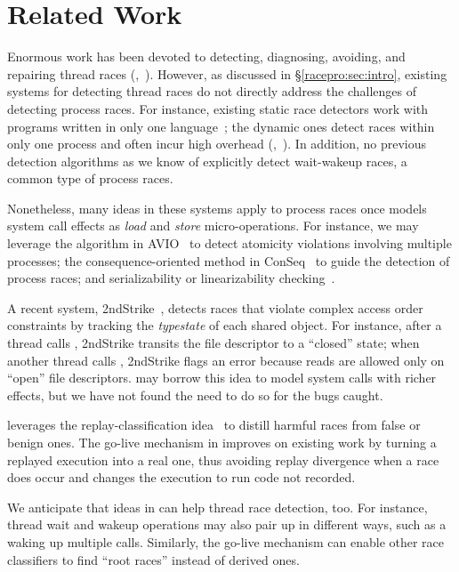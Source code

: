 \section{Related Work} \label{racepro:sec:related}

  Enormous work has been devoted to detecting,
diagnosing, avoiding, and repairing thread races
(\eg,~\cite{racerx:sosp03,chord:pldi06,pinsel:pldi07,racefuzzer:pldi08,wu:loom:osdi10,yu:racetrack:sosp}).
However, as discussed in \S\ref{racepro:sec:intro}, existing systems for detecting
thread races do not directly address the challenges of detecting process
races.  For instance, existing static race detectors work with programs
written in only one language~\cite{racerx:sosp03,chord:pldi06}; the
dynamic ones detect races within only one process and often incur high
overhead (\eg,~\cite{musuvathi:chess:osdi08}).  In addition, no previous
detection algorithms as we know of explicitly detect wait-wakeup races, a
common type of process races.

Nonetheless, many ideas in these systems apply to process races once \racepro
models system call effects as \emph{load} and \emph{store} micro-operations. 
For instance, we may leverage the algorithm in AVIO~\cite{avio:asplos06} to
detect atomicity violations involving multiple processes; the
consequence-oriented method in ConSeq~\cite{conseq:asplos11} to guide the
detection of process races; and serializability or linearizability
checking~\cite{linearizable:eurosys11}.

A recent system, 2ndStrike~\cite{2ndstrike:asplos11}, detects races that
violate complex access order constraints by tracking the \emph{typestate}
of each shared object.  For instance, after a thread calls ,
2ndStrike transits the file descriptor to a ``closed'' state; when another
thread calls , 2ndStrike flags an error because reads are
allowed only on ``open'' file descriptors.  \racepro may borrow this idea to
model system calls with richer effects, but we have not found the need to
do so for the bugs \racepro caught.

\racepro leverages the replay-classification idea~\cite{pinsel:pldi07} to
distill harmful races from false or benign ones.  The go-live mechanism in
\racepro improves on existing work by turning a replayed execution into a
real one, thus avoiding replay divergence when a race does occur and
changes the execution to run code not recorded.

We anticipate that ideas in \racepro can help thread race detection, too.  For
instance, thread wait and wakeup operations may also pair up in different
ways, such as a  waking up multiple
 calls.  Similarly, the go-live mechanism can
enable other race classifiers to find ``root races'' instead of derived
ones.

